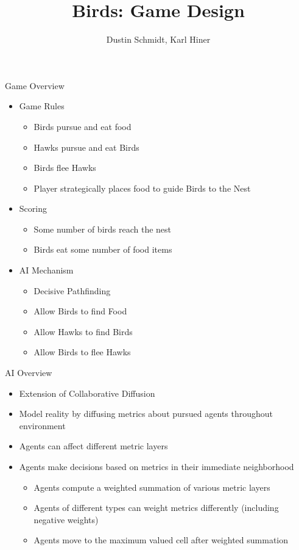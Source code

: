 \documentclass{beamer}
\begin{document}
\title{Birds: Game Design}
\author{Dustin Schmidt, Karl Hiner}
\maketitle

\begin{frame}{Game Overview}
  \begin{itemize}
    \item Game Rules
      \begin{itemize}
	\item Birds pursue and eat food
	\item Hawks pursue and eat Birds
	\item Birds flee Hawks
	\item Player strategically places food to guide Birds to the Nest
      \end{itemize}
    \item Scoring
      \begin{itemize}
	\item Some number of birds reach the nest
	\item Birds eat some number of food items
      \end{itemize}
    \item AI Mechanism
      \begin{itemize}
	\item Decisive Pathfinding
	\item Allow Birds to find Food
	\item Allow Hawks to find Birds
	\item Allow Birds to flee Hawks
      \end{itemize}
  \end{itemize} 

\end{frame}

\begin{frame}{AI Overview}
  \begin{itemize}
    \item Extension of Collaborative Diffusion
    \item Model reality by diffusing metrics about pursued agents throughout environment
    \item Agents can affect different metric layers
    \item Agents make decisions based on metrics in their immediate neighborhood
      \begin{itemize}
	\item Agents compute a weighted summation of various metric layers
	\item Agents of different types can weight metrics differently (including negative weights)
	\item Agents move to the maximum valued cell after weighted summation
      \end{itemize}
  \end{itemize}

\end{frame}
\end{document}

